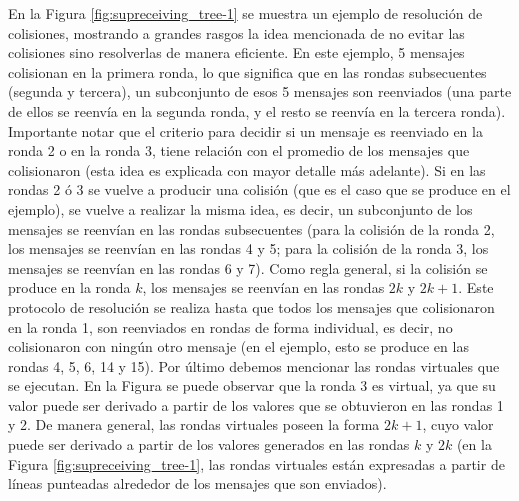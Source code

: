 En la Figura \ref{fig:supreceiving_tree-1} se muestra un ejemplo de resolución 
de colisiones, mostrando a grandes rasgos la idea mencionada de no evitar las 
colisiones sino resolverlas de manera eficiente. En este ejemplo, 5 mensajes 
colisionan en la primera ronda, lo que significa que en las rondas 
subsecuentes (segunda y tercera), un subconjunto de esos 5 mensajes son 
reenviados (una parte de ellos se reenvía en la segunda ronda, y el resto se 
reenvía en la tercera ronda). Importante notar que el criterio para decidir si 
un mensaje es reenviado en la ronda 2 o en la ronda 3, tiene relación con el 
promedio de los mensajes que colisionaron (esta idea es explicada con mayor 
detalle más adelante). Si en las rondas 2 ó 3 se vuelve a producir una 
colisión (que es el caso que se produce en el ejemplo), se vuelve a realizar 
la misma idea, es decir, un subconjunto de los mensajes se reenvían en las 
rondas subsecuentes (para la colisión de la ronda 2, los mensajes se reenvían 
en las rondas 4 y 5; para la colisión de la ronda 3, los mensajes se reenvían 
en las rondas 6 y 7). Como regla general, si la colisión se produce en la 
ronda $k$, los mensajes se reenvían en las rondas $2k$ y $2k + 1$. Este 
protocolo de resolución se realiza hasta que todos los mensajes que 
colisionaron en la ronda 1, son reenviados en rondas de forma individual, es 
decir, no colisionaron con ningún otro mensaje (en el ejemplo, esto se produce 
en las rondas 4, 5, 6, 14 y 15). Por último debemos mencionar las rondas 
virtuales que se ejecutan. En la Figura se puede observar que la ronda 3 es 
virtual, ya que su valor puede ser derivado a partir de los valores que se 
obtuvieron en las rondas 1 y 2. De manera general, las rondas virtuales poseen 
la forma $2k + 1$, cuyo valor puede ser derivado a partir de los valores 
generados en las rondas $k$ y $2k$ (en la Figura 
\ref{fig:supreceiving_tree-1}, las rondas virtuales están 
expresadas a partir de líneas punteadas alrededor de los mensajes que son 
enviados).

